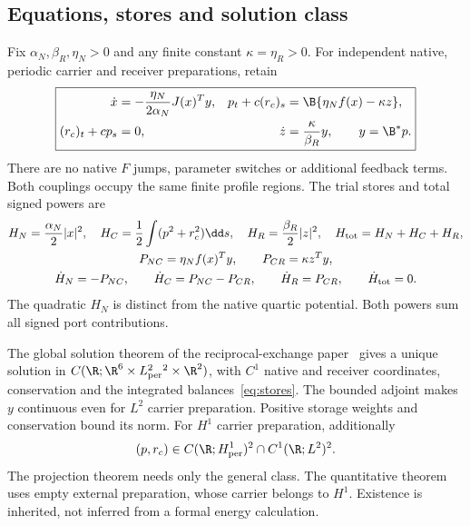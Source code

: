 \subsection{Equations, stores and solution class}
Fix $\alpha_N,\beta_R,\eta_N>0$ and any finite constant $\kappa=\eta_R>0$. For independent native, periodic carrier and receiver preparations, retain
\begin{equation}\label{eq:system}%
\boxed{\begin{aligned}
\dot x&=-\frac{\eta_N}{2\alpha_N}J(x)^Ty,
&p_t+c(r_c)_s&=\B\{\eta_N f(x)-\kappa z\},\\
(r_c)_t+cp_s&=0,
&\dot z&=\frac{\kappa}{\beta_R}y,\qquad y=\B^*p .
\end{aligned}}
\end{equation}
There are no native $F$ jumps, parameter switches or additional feedback terms. Both couplings occupy the same finite profile regions. The trial stores and total signed powers are
\begin{equation}\label{eq:stores}%
\begin{gathered}
H_N=\frac{\alpha_N}{2}|x|^2,\quad
H_C=\frac12\int(p^2+r_c^2)\dd s,\quad
H_R=\frac{\beta_R}{2}|z|^2,\quad H_{\rm tot}=H_N+H_C+H_R,\\
P_{NC}=\eta_N f(x)^Ty,\qquad P_{CR}=\kappa z^Ty,\\
\dot H_N=-P_{NC},\qquad \dot H_C=P_{NC}-P_{CR},\qquad
\dot H_R=P_{CR},\qquad \dot H_{\rm tot}=0.
\end{gathered}
\end{equation}
The quadratic $H_N$ is distinct from the native quartic potential. Both powers sum all signed port contributions.

The global solution theorem of the reciprocal-exchange paper~\cite[Theorem 3.1]{p1} gives a unique solution in $C(\R;\R^6\times L^2_{\rm per}{}^2\times\R^2)$, with $C^1$ native and receiver coordinates, conservation and the integrated balances~\eqref{eq:stores}. The bounded adjoint makes $y$ continuous even for $L^2$ carrier preparation. Positive storage weights and conservation bound its norm. For $H^1$ carrier preparation, additionally
\begin{equation}\label{eq:regularity}%
(p,r_c)\in C(\R;H^1_{\rm per})^2\cap C^1(\R;L^2)^2.
\end{equation}
The projection theorem needs only the general class. The quantitative theorem uses empty external preparation, whose carrier belongs to $H^1$. Existence is inherited, not inferred from a formal energy calculation.

